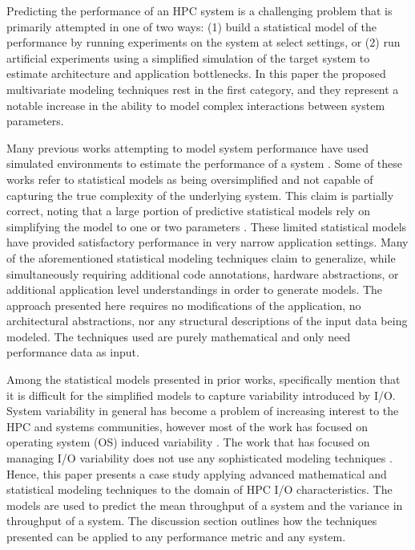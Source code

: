 \documentclass{scspaperproc}
\theoremstyle{scsthe}
\begin{document}
Predicting the performance of an HPC system is a challenging problem
that is primarily attempted in one of two ways: (1) build a
statistical model of the performance by running experiments on the
system at select settings, or (2) run artificial experiments using a
simplified simulation of the target system to estimate architecture
and application bottlenecks. In this paper the proposed multivariate
modeling techniques rest in the first category, and they represent a
notable increase in the ability to model complex interactions between
system parameters.

Many previous works attempting to model system performance have used
simulated environments to estimate the performance of a system
. Some
of these works refer to statistical models as being oversimplified and
not capable of capturing the true complexity of the underlying
system. This claim is partially correct, noting that a large portion
of predictive statistical models rely on simplifying the model to one
or two parameters
.
These limited statistical models have provided satisfactory
performance in very narrow application settings. Many of the
aforementioned statistical modeling techniques claim to generalize,
while simultaneously requiring additional code annotations, hardware
abstractions, or additional application level understandings in order
to generate models. The approach presented here requires no
modifications of the application, no architectural abstractions, nor
any structural descriptions of the input data being modeled. The
techniques used are purely mathematical and only need performance data
as input.

Among the statistical models presented in prior works,
 specifically mention that it is
difficult for the simplified models to capture variability introduced
by I/O. System variability in general has become a problem of
increasing interest to the HPC and systems communities, however most
of the work has focused on operating system (OS) induced variability
. The work that
has focused on managing I/O variability does not use any sophisticated
modeling techniques . Hence, this
paper presents a case study applying advanced mathematical and
statistical modeling techniques to the domain of HPC I/O
characteristics. The models are used to predict the mean throughput of
a system and the variance in throughput of a system. The discussion
section outlines how the techniques presented can be applied to any
performance metric and any system.
\end{document}
